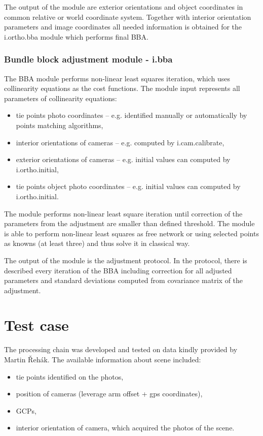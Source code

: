 \documentclass[a4paper,12pt]{article}
\begin{document}
The output of the module are exterior orientations and object coordinates in common relative or world coordinate system. Together with interior
orientation parameters and image coordinates all needed information is obtained for the i.ortho.bba module which performs final BBA.  

\subsubsection{Bundle block adjustment module - i.bba}

The BBA module performs non-linear least squares iteration, which 
uses collinearity equations as the cost functions. 
The module input represents all parameters of collinearity equations:
\begin{itemize}
\item tie points photo coordinates -- e.g. identified manually or automatically by points matching algorithms,
\item interior orientations of cameras -- e.g. computed by i.cam.calibrate,
\item exterior orientations of cameras -- e.g. initial values can computed by i.ortho.initial,
\item tie points object photo coordinates -- e.g. initial values can computed by i.ortho.initial.
\end{itemize}

The module performs non-linear least square iteration until correction of the parameters from the adjustment are smaller than
defined threshold. The module is able to perform non-linear least squares as free network or using selected points 
as knowns (at least three) and thus solve it in classical way. 

The output of the module is the adjustment protocol. In the protocol, there
is described every iteration of the BBA including correction for all adjusted parameters and standard deviations computed from 
covariance matrix of the adjustment. 


\section{Test case}

The processing chain was developed and tested on data kindly provided by Martin Řehák. The available 
information about scene included:

\begin{itemize}
\item tie points identified on the photos,
\item position of cameras (leverage arm offset + gps coordinates),
\item GCPs,
\item interior orientation of camera, which acquired the photos of the scene.
\end{itemize}
\end{document}
